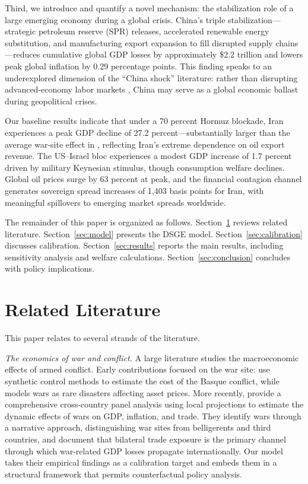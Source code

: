 \documentclass[12pt,a4paper]{article}
\begin{document}
Third, we introduce and quantify a novel mechanism: the stabilization role of a large emerging economy during a global crisis. China's triple stabilization---strategic petroleum reserve (SPR) releases, accelerated renewable energy substitution, and manufacturing export expansion to fill disrupted supply chains---reduces cumulative global GDP losses by approximately \$2.2 trillion and lowers peak global inflation by 0.29 percentage points. This finding speaks to an underexplored dimension of the ``China shock'' literature: rather than disrupting advanced-economy labor markets \citep{autor2013china}, China may serve as a global economic ballast during geopolitical crises.

Our baseline results indicate that under a 70 percent Hormuz blockade, Iran experiences a peak GDP decline of 27.2 percent---substantially larger than the average war-site effect in \citet{federle2026price}, reflecting Iran's extreme dependence on oil export revenue. The US--Israel bloc experiences a modest GDP increase of 1.7 percent driven by military Keynesian stimulus, though consumption welfare declines. Global oil prices surge by 63 percent at peak, and the financial contagion channel generates sovereign spread increases of 1,403 basis points for Iran, with meaningful spillovers to emerging market spreads worldwide.

The remainder of this paper is organized as follows. Section~\ref{sec:literature} reviews related literature. Section~\ref{sec:model} presents the DSGE model. Section~\ref{sec:calibration} discusses calibration. Section~\ref{sec:results} reports the main results, including sensitivity analysis and welfare calculations. Section~\ref{sec:conclusion} concludes with policy implications.



\section{Related Literature}
\label{sec:literature}

This paper relates to several strands of the literature.

\textit{The economics of war and conflict.} A large literature studies the macroeconomic effects of armed conflict. Early contributions focused on the war site: \citet{abadie2003economic} use synthetic control methods to estimate the cost of the Basque conflict, while \citet{barro2006rare} models wars as rare disasters affecting asset prices. More recently, \citet{federle2026price} provide a comprehensive cross-country panel analysis using local projections \citep{jorda2005estimation} to estimate the dynamic effects of wars on GDP, inflation, and trade. They identify wars through a narrative approach, distinguishing war sites from belligerents and third countries, and document that bilateral trade exposure is the primary channel through which war-related GDP losses propagate internationally. Our model takes their empirical findings as a calibration target and embeds them in a structural framework that permits counterfactual policy analysis.
\end{document}

